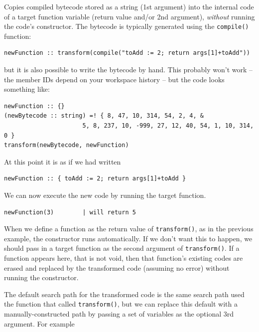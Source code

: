 \documentclass{article}
\newenvironment{code}{
       \begin{list}{}{
               \setlength{\leftmargin}{.4in}
               \setlength{\rightmargin}{0in}
               \setlength{\topsep}{.2in}
       }
       \small
       \item[] }
       { \end{list}   }
\begin{document}
Copies compiled bytecode stored as a string (1st argument) into the internal code of a target function variable (return value and/or 2nd argument), \emph{without} running the code's constructor.  The bytecode is typically generated using the \verb#compile()# function:

\begin{code} \begin{verbatim}
newFunction :: transform(compile("toAdd := 2; return args[1]+toAdd"))
\end{verbatim} \end{code}

\noindent but it is also possible to write the bytecode by hand.  This probably won't work -- the member IDs depend on your workspace history -- but the code looks something like:

\begin{code} \begin{verbatim}
newFunction :: {}
(newBytecode :: string) =! { 8, 47, 10, 314, 54, 2, 4, &
                      5, 8, 237, 10, -999, 27, 12, 40, 54, 1, 10, 314, 0 }
transform(newBytecode, newFunction)
\end{verbatim} \end{code}

\noindent At this point it is as if we had written

\begin{code} \begin{verbatim}
newFunction :: { toAdd := 2; return args[1]+toAdd }
\end{verbatim} \end{code}

\noindent We can now execute the new code by running the target function.

\begin{code} \begin{verbatim}
newFunction(3)        | will return 5
\end{verbatim} \end{code}

When we define a function as the return value of \verb#transform()#, as in the previous example, the constructor runs automatically.  If we don't want this to happen, we should pass in a target function as the second argument of \verb#transform()#.  If a function appears here, that is not void, then that function's existing codes are erased and replaced by the transformed code (assuming no error) without running the constructor.

The default search path for the transformed code is the same search path used the function that called \verb#transform()#, but we can replace this default with a manually-constructed path by passing a set of variables as the optional 3rd argument.  For example
\end{document}
